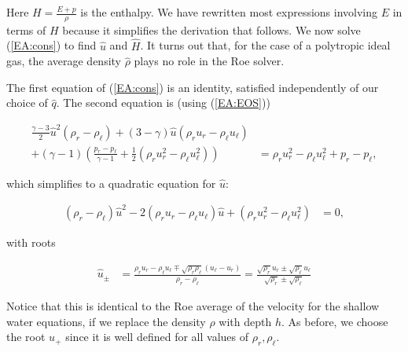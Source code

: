 \documentclass{SIAMbook2016}
\begin{document}
Here \(H = \frac{E+p}{\rho}\) is the enthalpy. We have rewritten most
expressions involving \(E\) in terms of \(H\) because it simplifies the
derivation that follows. We now solve (\ref{EA:cons}) to find
\(\hat{u}\) and \(\hat{H}\). It turns out that, for the case of a
polytropic ideal gas, the average density \(\hat{\rho}\) plays no role
in the Roe solver.

The first equation of (\ref{EA:cons}) is an identity, satisfied
independently of our choice of \(\hat{q}\). The second equation is
(using (\ref{EA:EOS}))

\begin{align}
    \frac{\gamma-3}{2}\hat{u}^2 (\rho_r - \rho_\ell) + (3-\gamma)\hat{u}(\rho_r u_r - \rho_\ell u_\ell) \\ + (\gamma-1)\left( \frac{p_r-p_\ell}{\gamma-1} + \frac{1}{2}(\rho_r u_r^2 - \rho_\ell u_\ell^2) \right) & = \rho_r u_r^2 - \rho_\ell u_\ell^2 + p_r - p_\ell,
\end{align}

which simplifies to a quadratic equation for \(\hat{u}\):

\begin{align} \label{EA:u_quadratic}
    (\rho_r - \rho_\ell)\hat{u}^2 - 2(\rho_r u_r - \rho_\ell u_\ell) \hat{u} + (\rho_r u_r^2 - \rho_\ell u_\ell^2) & = 0,
\end{align}

with roots

\begin{align}
    \hat{u}_\pm & = \frac{\rho_r u_r - \rho_\ell u_\ell \mp \sqrt{\rho_r \rho_\ell} (u_\ell - u_r)}{\rho_r - \rho_\ell} = \frac{\sqrt{\rho_r} u_r \pm \sqrt{\rho_\ell} u_\ell}{\sqrt{\rho_r}\pm\sqrt{\rho_\ell}}
\end{align}

Notice that this is identical to the Roe average of the velocity for the
shallow water equations, if we replace the density \(\rho\) with depth
\(h\). As before, we choose the root \(u_+\) since it is well defined
for all values of \(\rho_r, \rho_\ell\).
\end{document}
